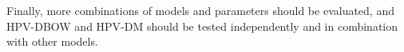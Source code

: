 Finally, more combinations of models and parameters should be evaluated, and HPV-DBOW and HPV-DM should be tested independently and in combination with other models.

